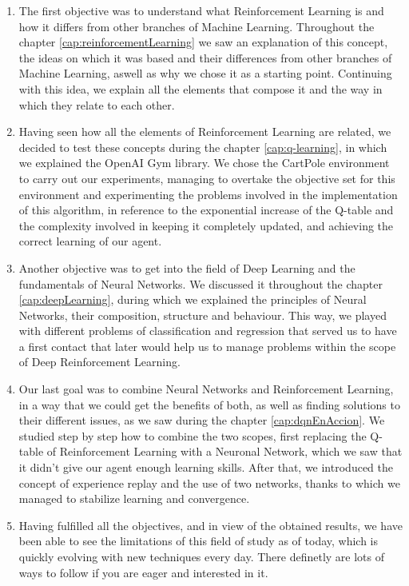 \begin{enumerate}
        \item The first objective was to understand what Reinforcement Learning is and how it differs from other branches of Machine Learning. Throughout the chapter \ref{cap:reinforcementLearning} we saw an explanation of this concept, the ideas on which it was based and their differences from other branches of Machine Learning, aswell as why we chose it as a starting point. Continuing with this idea, we explain all the elements that compose it and the way in which they relate to each other.
        \item Having seen how all the elements of Reinforcement Learning are related, we decided to test these concepts during the chapter \ref{cap:q-learning}, in which we explained the OpenAI Gym library. We chose the CartPole environment to carry out our experiments, managing to overtake the objective set for this environment and experimenting the problems involved in the implementation of this algorithm, in reference to the exponential increase of the Q-table and the complexity involved in keeping it completely updated, and achieving the correct learning of our agent.
        \item Another objective was to get into the field of Deep Learning and the fundamentals of Neural Networks. We discussed it throughout the chapter \ref{cap:deepLearning}, during which we explained the principles of Neural Networks, their composition, structure and behaviour. This way, we played with different problems of classification and regression that served us to have a first contact that later would help us to manage problems within the scope of Deep Reinforcement Learning.
        \item Our last goal was to combine Neural Networks and Reinforcement Learning, in a way that we could get the benefits of both, as well as finding solutions to their different issues, as we saw during the chapter \ref{cap:dqnEnAccion}. We studied step by step how to combine the two scopes, first replacing the Q-table of Reinforcement Learning with a Neuronal Network, which we saw that it didn't give our agent enough learning skills. After that, we introduced the concept of experience replay and the use of two networks, thanks to which we managed to stabilize learning and convergence.
        \item Having fulfilled all the objectives, and in view of the obtained results, we have been able to see the limitations of this field of study as of today, which is quickly evolving with new techniques every day. There definetly are lots of ways to follow if you are eager and interested in it.
\end{enumerate}

